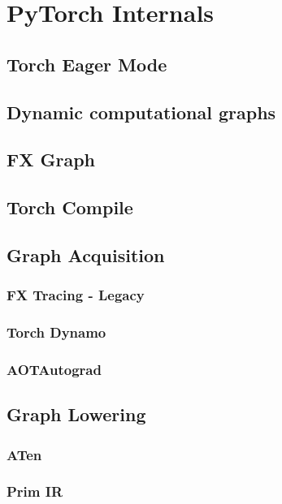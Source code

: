 
\section{PyTorch Internals}
  \subsection*{Torch Eager Mode}\label{subsec:torch_eager_mode}

  \subsection*{Dynamic computational graphs}\label{subsec:name}
  \subsection*{FX Graph}\label{subsec:name}

  \subsection*{Torch Compile}\label{subsec:torch_compile}
  \subsection*{Graph Acquisition}
    \subsubsection{FX Tracing - Legacy}
    \subsubsection{Torch Dynamo}
      
    \subsubsection{AOTAutograd}
  \subsection*{Graph Lowering}
    \subsubsection{ATen}
    \subsubsection{Prim IR}
